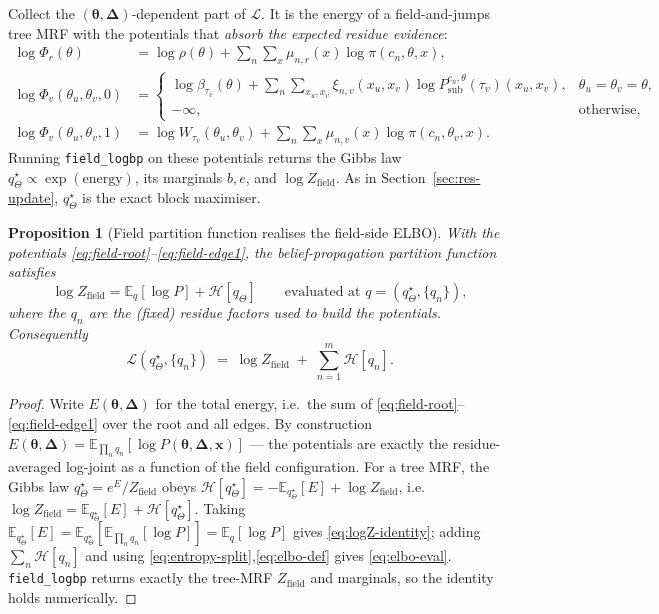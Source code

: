 \documentclass[11pt]{article}
\newtheorem{proposition}{Proposition}
\newcommand{\btheta}{\bm{\theta}}
\newcommand{\bDelta}{\bm{\Delta}}
\newcommand{\bx}{\bm{x}}
\newcommand{\Eq}[2]{\mathbb{E}_{#1}\!\left[#2\right]}
\newcommand{\Ent}[1]{\mathcal{H}\!\left[#1\right]}
\newcommand{\Psub}{P_{\mathrm{sub}}}
\begin{document}
Collect the $(\btheta,\bDelta)$-dependent part of $\mathcal L$. It is the
energy of a field-and-jumps tree MRF with the potentials that
\emph{absorb the expected residue evidence}:
\begin{align}
\log\Phi_r(\theta) &= \log\rho(\theta) + \sum_n\sum_x\mu_{n,r}(x)\log\pi(c_n,\theta,x),
   \label{eq:field-root}\\
\log\Phi_v(\theta_u,\theta_v,0) &=
  \begin{cases}
   \log\beta_{\tau_v}(\theta) + \sum_n\sum_{x_u,x_v}\xi_{n,v}(x_u,x_v)\log\Psub^{c_n,\theta}(\tau_v)(x_u,x_v),
     & \theta_u{=}\theta_v{=}\theta,\\
   -\infty, & \text{otherwise},
  \end{cases}\label{eq:field-edge0}\\
\log\Phi_v(\theta_u,\theta_v,1) &=
   \log W_{\tau_v}(\theta_u,\theta_v) + \sum_n\sum_x\mu_{n,v}(x)\log\pi(c_n,\theta_v,x).
   \label{eq:field-edge1}
\end{align}
Running \texttt{field\_logbp} on these potentials returns the Gibbs law
$q_\Theta^\star\propto\exp(\text{energy})$, its marginals $b,e$, and
$\log Z_{\mathrm{field}}$. As in Section~\ref{sec:res-update}, $q_\Theta^\star$
is the exact block maximiser.

\begin{proposition}[Field partition function realises the field-side ELBO]
\label{prop:field-elbo}
With the potentials \eqref{eq:field-root}--\eqref{eq:field-edge1}, the
belief-propagation partition function satisfies
\begin{equation}
\log Z_{\mathrm{field}} = \Eq{q}{\log P} + \Ent{q_\Theta}
\qquad\text{evaluated at } q=(q_\Theta^\star,\{q_n\}),
\label{eq:logZ-identity}
\end{equation}
where the $q_n$ are the (fixed) residue factors used to build the potentials.
Consequently
\begin{equation}
\boxed{\;\mathcal L(q_\Theta^\star,\{q_n\}) \;=\; \log Z_{\mathrm{field}}
   \;+\; \sum_{n=1}^m \Ent{q_n}.\;}
\label{eq:elbo-eval}
\end{equation}
\end{proposition}
\begin{proof}
Write $E(\btheta,\bDelta)$ for the total energy, i.e.\ the sum of
\eqref{eq:field-root}--\eqref{eq:field-edge1} over the root and all edges. By
construction $E(\btheta,\bDelta)=\Eq{\prod_n q_n}{\log P(\btheta,\bDelta,\bx)}$
--- the potentials are exactly the residue-averaged log-joint as a function of
the field configuration. For a tree MRF, the Gibbs law
$q_\Theta^\star=e^{E}/Z_{\mathrm{field}}$ obeys
$\Ent{q_\Theta^\star}=-\Eq{q_\Theta^\star}{E}+\log Z_{\mathrm{field}}$, i.e.\
$\log Z_{\mathrm{field}}=\Eq{q_\Theta^\star}{E}+\Ent{q_\Theta^\star}$. Taking
$\Eq{q_\Theta^\star}{E}=\Eq{q_\Theta^\star}{\Eq{\prod_n q_n}{\log P}}
=\Eq{q}{\log P}$ gives \eqref{eq:logZ-identity}; adding
$\sum_n\Ent{q_n}$ and using \eqref{eq:entropy-split},\eqref{eq:elbo-def} gives
\eqref{eq:elbo-eval}. \texttt{field\_logbp} returns exactly the tree-MRF
$Z_{\mathrm{field}}$ and marginals, so the identity holds numerically.
\end{proof}
\end{document}
